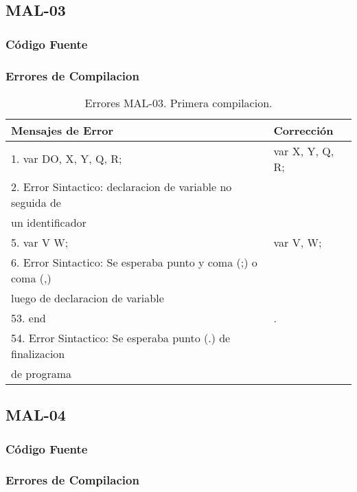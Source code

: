 \documentclass[a4paper,12pt]{article}
\begin{document}
\subsection{MAL-03}
\subsubsection{Código Fuente}

\subsubsection{Errores de Compilacion}

\begin{table}[h!]
\centering
\begin{tabular}{|l|l|}
\hline
Mensajes de Error & Corrección\\
\hline
1. var DO, X, Y, Q, R;										& var X, Y, Q, R;\\
2. Error Sintactico: declaracion de variable no seguida de 	&\\
un identificador												&\\
\hline
5. var V W;													& var V, W;\\
6. Error Sintactico: Se esperaba punto y coma (;) o coma (,) &\\
luego de declaracion de variable								&\\
\hline
53. end														& .\\
54. Error Sintactico: Se esperaba punto (.) de finalizacion 	&\\
de programa													&\\
\hline
\end{tabular}
\caption{Errores MAL-03. Primera compilacion.}
\label{MAL-03-1}
\end{table}

\subsection{MAL-04}
\subsubsection{Código Fuente}

\subsubsection{Errores de Compilacion}
\end{document}
